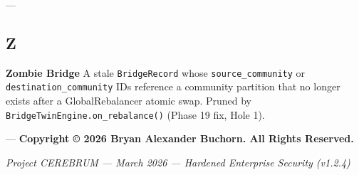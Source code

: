 \documentclass[11pt,article,oneside]{memoir}
\begin{document}
---

\subsection{Z}

\textbf{Zombie Bridge}
A stale \texttt{BridgeRecord} whose \texttt{source\_community} or \texttt{destination\_community} IDs reference a community partition that no longer exists after a GlobalRebalancer atomic swap. Pruned by \texttt{BridgeTwinEngine.on\_rebalance()} (Phase 19 fix, Hole 1).

---
\textbf{Copyright © 2026 Bryan Alexander Buchorn. All Rights Reserved.}


\vspace{3em}
\begin{center}
    \small \textit{Project CEREBRUM — March 2026 — Hardened Enterprise Security (v1.2.4)}
\end{center}
\end{document}
